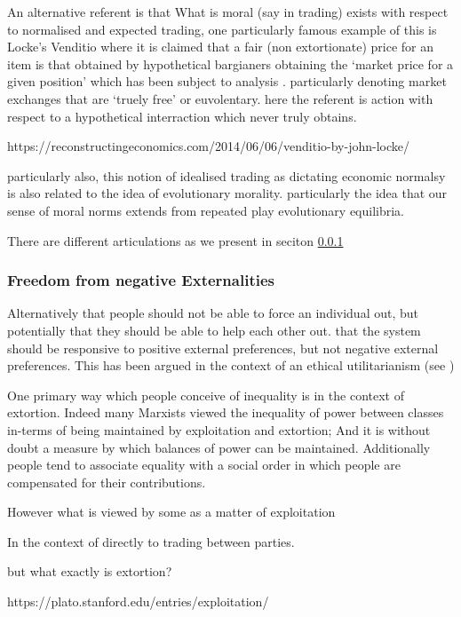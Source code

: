 An alternative referent is that What is moral (say in trading) exists with respect to normalised and expected trading, one particularly famous example of this is Locke's Venditio \cite{locke2003locke}
where it is claimed that a fair (non extortionate) price for an item is that obtained by hypothetical bargianers obtaining the `market price for a given position'
which has been subject to analysis \cite{Guzman2019}.
particularly denoting market exchanges that are `truely free' or euvolentary.
here the referent is action with respect to a hypothetical interraction which never truly obtains.


https://reconstructingeconomics.com/2014/06/06/venditio-by-john-locke/

particularly also, this notion of idealised trading as dictating economic normalsy is also related to the idea of evolutionary morality.
particularly the idea that our sense of moral norms extends from repeated play evolutionary equilibria. \cite{Binmore10785}


There are different articulations as we present in seciton \ref{}

\subsubsection{Freedom from negative Externalities}

Alternatively that people should not be able to force an individual out, but potentially that they should be able to help each other out.
that the system should be responsive to positive external preferences, but not negative external preferences.
This has been argued in the context of an ethical utilitarianism (see \cite{kymlicka2002contemporary})

One primary way which people conceive of inequality is in the context of extortion. Indeed many Marxists viewed the inequality of power between classes in-terms of being maintained by exploitation and extortion; And it is without doubt a measure by which balances of power can be maintained. Additionally people tend to associate equality with a social order in which people are compensated for their contributions.

However what is viewed by some as a matter of exploitation

In the context of directly to trading between parties.

but what exactly is extortion? 

https://plato.stanford.edu/entries/exploitation/



